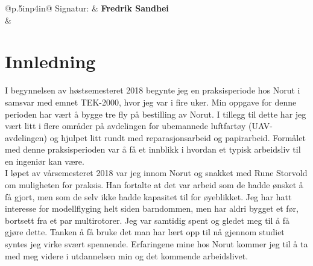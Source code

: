 \documentclass[12pt, a4paper]{article}
\begin{document}
\begin{flushleft}
	\begin{tabular}{@{}p{.5in}p{4in}@{}}
	Signatur: & \hspace{.5cm}\textbf{Fredrik Sandhei} \\
			  & \hrulefill \\
	\end{tabular}

\end{flushleft}
\clearpage

\begin{minipage}[b]{1\linewidth}
	\tableofcontents
	\vspace{.5cm}
\end{minipage}
\begin{minipage}[b]{1\linewidth}
	\listoffigures
\end{minipage}
\clearpage

\section{Innledning}
I begynnelsen av høstsemesteret 2018 begynte jeg en praksisperiode hos Norut i samsvar med emnet TEK-2000, hvor jeg var i fire uker. Min oppgave for denne perioden har vært å bygge tre fly på bestilling av Norut. I tillegg til dette har jeg vært litt i flere områder på avdelingen for ubemannede luftfartøy (UAV-avdelingen) og hjulpet litt rundt med reparasjonsarbeid og papirarbeid. Formålet med denne praksisperioden var å få et innblikk i hvordan et typisk arbeidsliv til en ingeniør kan være. \\

I løpet av vårsemesteret 2018 var jeg innom Norut og snakket med Rune Storvold om muligheten for praksis. Han fortalte at det var arbeid som de hadde ønsket å få gjort, men som de selv ikke hadde kapasitet til for øyeblikket. Jeg har hatt interesse for modellflyging helt siden barndommen, men har aldri bygget et før, bortsett fra et par multirotorer. Jeg var samtidig spent og gledet meg til å få gjøre dette. Tanken å få bruke det man har lært opp til nå gjennom studiet syntes jeg virke svært spennende. Erfaringene mine hos Norut kommer jeg til å ta med meg videre i utdannelsen min og det kommende arbeidslivet. 

\end{document}
